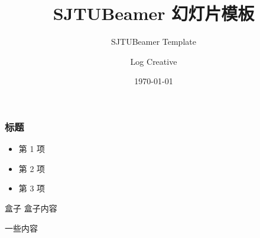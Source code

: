 \documentclass{beamer}
\title{\textsf{SJTUBeamer} 幻灯片模板}
\subtitle{SJTUBeamer Template}
\author{Log Creative}
\institute[]{github.com/LogCreative}
\date{\today}
\begin{document}
    

    \sjtutitle

    \begin{frame}
        \frametitle{标题}

        \begin{itemize}
            \item 第 1 项
            \item 第 2 项
            \item 第 3 项
        \end{itemize}

        \begin{block}{盒子}
            盒子内容
        \end{block}
    \end{frame}

    \begin{frame}
        一些内容
    \end{frame}
\end{document}
